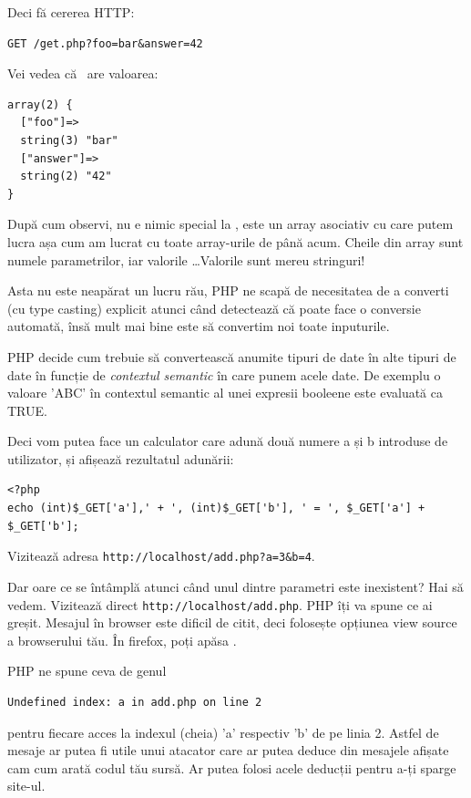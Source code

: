 Deci fă cererea HTTP:
\begin{verbatim}
GET /get.php?foo=bar&answer=42
\end{verbatim}

Vei vedea că \get\ are valoarea:
\begin{verbatim}
array(2) {
  ["foo"]=>
  string(3) "bar"
  ["answer"]=>
  string(2) "42"
}
\end{verbatim}
După cum observi, nu e nimic special la \get, este un array asociativ
cu care putem lucra așa cum am lucrat cu toate array-urile de până acum.
Cheile din array sunt numele parametrilor, iar valorile \ldots Valorile sunt
mereu stringuri!

Asta nu este neapărat un lucru rău, PHP ne scapă de necesitatea de a converti
(cu type casting) explicit atunci când detectează că poate face o conversie
automată, însă mult mai bine este să convertim noi toate inputurile.

PHP decide cum trebuie să convertească anumite tipuri de date în alte tipuri
de date în funcție de \textit{contextul semantic} în care punem acele date. De exemplu
o valoare 'ABC' în contextul semantic al unei expresii booleene este evaluată
ca TRUE.


Deci vom putea face un calculator care adună două numere a și b
introduse de utilizator, și afișează rezultatul adunării:
\begin{lstlisting}
<?php
echo (int)$_GET['a'],' + ', (int)$_GET['b'], ' = ', $_GET['a'] + $_GET['b'];
\end{lstlisting}
Vizitează adresa \texttt{http://localhost/add.php?a=3\&b=4}.

Dar oare ce se întâmplă atunci când unul dintre parametri este inexistent?
Hai să vedem. Vizitează direct \texttt{http://localhost/add.php}. PHP îți
va spune ce ai greșit. Mesajul în browser este dificil de citit, deci
folosește opțiunea {\glqq}view source{\grqq} a browserului tău. În firefox, poți apăsa
.

PHP ne spune ceva de genul
\begin{verbatim}
Undefined index: a in add.php on line 2
\end{verbatim}
pentru fiecare acces la indexul (cheia) 'a' respectiv 'b'
de pe linia 2. Astfel de mesaje ar putea fi utile unui
atacator care ar putea deduce din mesajele afișate cam cum
arată codul tău sursă. Ar putea folosi acele deducții pentru
a-ți sparge site-ul.

